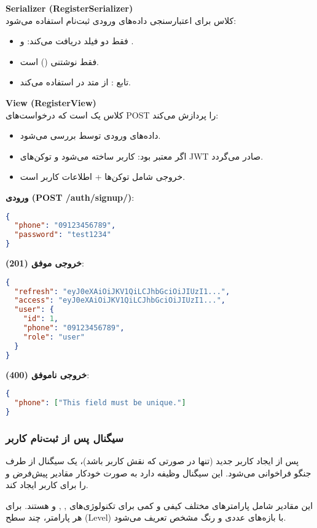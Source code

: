 \documentclass{report}
\begin{document}
\textbf{Serializer (RegisterSerializer)} \\
کلاس  برای اعتبارسنجی داده‌های ورودی ثبت‌نام استفاده می‌شود:
\begin{itemize}
  \item فقط دو فیلد دریافت می‌کند:  و .
  \item {} فقط نوشتنی () است.
  \item تابع : از متد  در  استفاده می‌کند.
\end{itemize}

\textbf{View (RegisterView)} \\
کلاس  یک  است که درخواست‌های POST را پردازش می‌کند:
\begin{itemize}
  \item داده‌های ورودی توسط  بررسی می‌شود.
  \item اگر معتبر بود: کاربر ساخته می‌شود و توکن‌های JWT صادر می‌گردد.
  \item خروجی شامل توکن‌ها + اطلاعات کاربر است.
\end{itemize}

\textbf{ورودی (POST /auth/signup/)}:
\begin{lstlisting}[language=json]
{
  "phone": "09123456789",
  "password": "test1234"
}
\end{lstlisting}

\textbf{خروجی موفق (201)}:
\begin{lstlisting}[language=json]
{
  "refresh": "eyJ0eXAiOiJKV1QiLCJhbGciOiJIUzI1...",
  "access": "eyJ0eXAiOiJKV1QiLCJhbGciOiJIUzI1...",
  "user": {
    "id": 1,
    "phone": "09123456789",
    "role": "user"
  }
}
\end{lstlisting}

\textbf{خروجی ناموفق (400)}:
\begin{lstlisting}[language=json]
{
  "phone": ["This field must be unique."]
}
\end{lstlisting}
\subsubsection{سیگنال پس از ثبت‌نام کاربر}
پس از ایجاد کاربر جدید (تنها در صورتی که نقش کاربر  باشد)، یک سیگنال  از طرف جنگو فراخوانی می‌شود. این سیگنال وظیفه دارد به صورت خودکار مقادیر پیش‌فرض  و  را برای کاربر ایجاد کند. 

این مقادیر شامل پارامترهای مختلف کیفی و کمی برای تکنولوژی‌های , ,  و  هستند. برای هر پارامتر، چند سطح (Level) با بازه‌های عددی و رنگ مشخص تعریف می‌شود.  
\end{document}
